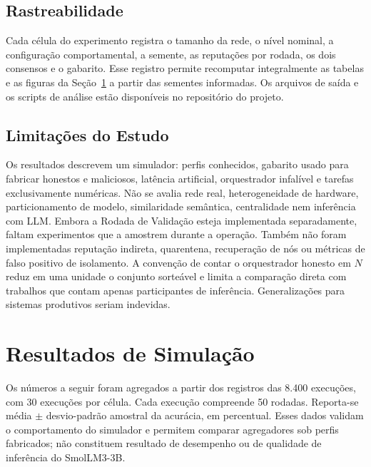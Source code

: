 \documentclass[12pt]{article}
\begin{document}
\subsection{Rastreabilidade}

Cada célula do experimento registra o tamanho da rede, o nível nominal, a configuração comportamental, a semente, as reputações por rodada, os dois consensos e o gabarito. Esse registro permite recomputar integralmente as tabelas e as figuras da Seção~\ref{sec:resultados} a partir das sementes informadas. Os arquivos de saída e os scripts de análise estão disponíveis no repositório do projeto.

\subsection{Limitações do Estudo}

Os resultados descrevem um simulador: perfis conhecidos, gabarito usado para fabricar honestos e maliciosos, latência artificial, orquestrador infalível e tarefas exclusivamente numéricas. Não se avalia rede real, heterogeneidade de hardware, particionamento de modelo, similaridade semântica, centralidade nem inferência com LLM. Embora a Rodada de Validação esteja implementada separadamente, faltam experimentos que a amostrem durante a operação. Também não foram implementadas reputação indireta, quarentena, recuperação de nós ou métricas de falso positivo de isolamento. A convenção de contar o orquestrador honesto em $N$ reduz em uma unidade o conjunto sorteável e limita a comparação direta com trabalhos que contam apenas participantes de inferência. Generalizações para sistemas produtivos seriam indevidas.

\section{Resultados de Simulação}
\label{sec:resultados}

Os números a seguir foram agregados a partir dos registros das 8.400 execuções, com 30 execuções por célula. Cada execução compreende 50 rodadas. Reporta-se média $\pm$ desvio-padrão amostral da acurácia, em percentual. Esses dados validam o comportamento do simulador e permitem comparar agregadores sob perfis fabricados; não constituem resultado de desempenho ou de qualidade de inferência do SmolLM3-3B.
\end{document}
